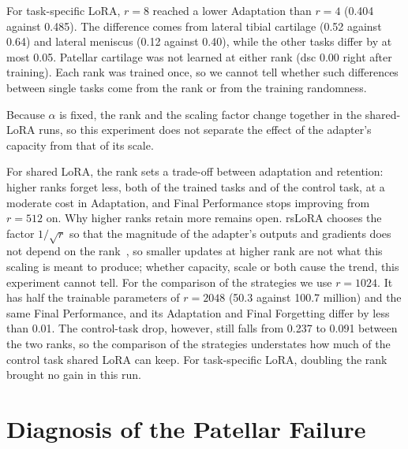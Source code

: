 For task-specific LoRA, $r = 8$ reached a lower Adaptation than $r = 4$ (0.404 against 0.485).
The difference comes from lateral tibial cartilage (0.52 against 0.64) and lateral meniscus (0.12 against 0.40), while the other tasks differ by at most 0.05.
Patellar cartilage was not learned at either rank (\gls{dsc} 0.00 right after training).
Each rank was trained once, so we cannot tell whether such differences between single tasks come from the rank or from the training randomness.

Because $\alpha$ is fixed, the rank and the scaling factor change together in the shared-LoRA runs, so this experiment does not separate the effect of the adapter's capacity from that of its scale.

For shared LoRA, the rank sets a trade-off between adaptation and retention: higher ranks forget less, both of the trained tasks and of the control task, at a moderate cost in Adaptation, and Final Performance stops improving from $r = 512$ on.
Why higher ranks retain more remains open.
rsLoRA chooses the factor $1/\sqrt{r}$ so that the magnitude of the adapter's outputs and gradients does not depend on the rank~\cite[Sec.~3]{kalajdzievski2023rankstabilizationscalingfactor}, so smaller updates at higher rank are not what this scaling is meant to produce; whether capacity, scale or both cause the trend, this experiment cannot tell.
For the comparison of the strategies we use $r = 1024$.
It has half the trainable parameters of $r = 2048$ (50.3 against 100.7 million) and the same Final Performance, and its Adaptation and Final Forgetting differ by less than 0.01.
The control-task drop, however, still falls from 0.237 to 0.091 between the two ranks, so the comparison of the strategies understates how much of the control task shared LoRA can keep.
For task-specific LoRA, doubling the rank brought no gain in this run.

\section{Diagnosis of the Patellar Failure}
\label{sec:exp-patellar}

